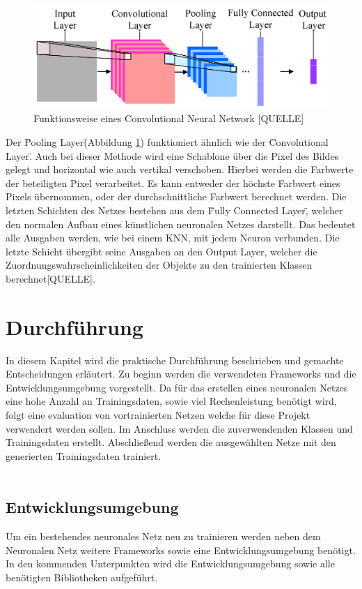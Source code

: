 \documentclass[a4paper,12pt,oneside]{article}
\begin{document}
\begin{figure}
    [h]
	\centering
	\includegraphics[scale=1.5]{Sources/cnn.png}
		\caption{Funktionsweise eines Convolutional Neural Network [QUELLE]}
	\label{img:CNN}
\end{figure}

Der \"Pooling Layer\" (Abbildung \ref{img:CNN}) funktioniert ähnlich wie der \"Convolutional Layer\". Auch bei dieser Methode wird eine Schablone über die Pixel des Bildes gelegt und horizontal wie auch vertikal verschoben. Hierbei werden die Farbwerte der beteiligten Pixel verarbeitet. Es kann entweder der höchste Farbwert eines Pixels übernommen, oder der durchschnittliche Farbwert berechnet werden. Die letzten Schichten des Netzes bestehen aus dem \"Fully Connected Layer\", welcher den normalen Aufbau eines künstlichen neuronalen Netzes darstellt. Das bedeutet alle Ausgaben werden, wie bei einem KNN, mit jedem Neuron verbunden. Die letzte Schicht übergibt seine Ausgaben an den Output Layer, welcher die Zuordnungswahrscheinlichkeiten der Objekte zu den trainierten Klassen berechnet[QUELLE].


  \section{Durchführung}
In diesem Kapitel wird die praktische Durchführung beschrieben und gemachte Entscheidungen erläutert. Zu beginn werden die verwendeten Frameworks und die Entwicklungsumgebung vorgestellt. Da für das erstellen eines neuronalen Netzes eine hohe Anzahl an Trainingsdaten, sowie viel Rechenleistung benötigt wird, folgt eine evaluation von vortrainierten Netzen welche für diese Projekt verwendert werden sollen. Im Anschluss werden die zuverwendenden Klassen und Trainingsdaten erstellt. Abschließend werden die ausgewählten Netze mit den generierten Trainingsdaten trainiert. \\
\\

\subsection{Entwicklungsumgebung}
Um ein bestehendes neuronales Netz neu zu trainieren werden neben dem Neuronalen Netz weitere Frameworks sowie eine Entwicklungsumgebung benötigt. In den kommenden Unterpunkten wird die Entwicklungsumgebung sowie alle benötigten Bibliotheken aufgeführt. 
\end{document}

